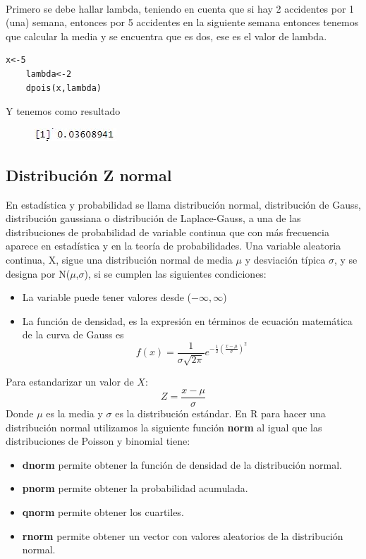 \documentclass[12pt,hidelinks]{article}
\begin{document}
\paragraph{} Primero se debe hallar lambda, teniendo en cuenta que si hay 2 accidentes por 1 (una) semana, entonces por 5 accidentes en la siguiente semana entonces tenemos que calcular la media y se encuentra que es dos, ese es el valor de lambda.
\begin{lstlisting}[frame=single]
	x<-5
	lambda<-2
	dpois(x,lambda)
\end{lstlisting}
Y tenemos como resultado
\begin{figure}[h!]
	\centering
	\includegraphics[width=0.4\linewidth]{images/3/poisson.JPG}
\end{figure}
\subsection{Distribución Z normal}
En estadística y probabilidad se llama distribución normal, distribución de Gauss, distribución gaussiana o distribución de Laplace-Gauss, a una de las distribuciones de probabilidad de variable continua que con más frecuencia aparece en estadística y en la teoría de probabilidades. Una variable aleatoria continua, X, sigue una distribución normal de media $\mu$ y desviación típica $\sigma$, y se designa por N($\mu$,$\sigma$), si se cumplen las siguientes condiciones:
\begin{itemize}
	\item La variable puede tener valores desde ($-\infty,\infty$)
	\item La función de densidad, es la expresión en términos de ecuación matemática de la curva de Gauss es
	\[
	f(x)=\frac{1}{\sigma\sqrt{2\pi}}e^{-\frac{1}{2}(\frac{x-\mu}{\sigma})^2}
	\]
\end{itemize}
Para estandarizar un valor de $X$:
\[Z=\frac{x-\mu}{\sigma}\]
Donde $\mu$ es la media y $\sigma$ es la distribución estándar. En R para hacer una distribución normal utilizamos la siguiente función \textbf{norm} al igual que las distribuciones de Poisson y binomial tiene:
\begin{itemize}
	\item \textbf{dnorm} permite obtener la función de densidad de la distribución normal.
	\item \textbf{pnorm} permite obtener la probabilidad acumulada.
	\item \textbf{qnorm} permite obtener los cuartiles.
	\item \textbf{rnorm} permite obtener un vector con valores aleatorios de la distribución normal.
\end{itemize}
\end{document}
